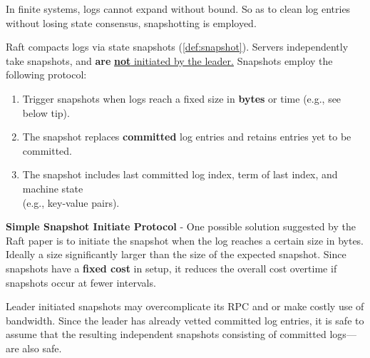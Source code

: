 \noindent
In finite systems, logs cannot expand without bound. So as to clean log entries without losing state consensus, snapshotting is employed.
\begin{Def}

    Raft compacts logs via state snapshots (\ref{def:snapshot}). Servers independently take snapshots, and \textbf{are} \underline{\textbf{not} initiated by the leader.}
    Snapshots employ the following protocol:
    \begin{enumerate}
        \item Trigger snapshots when logs reach a fixed size in \textbf{bytes} or time (e.g., see below tip).
        \item The snapshot replaces \textbf{committed} log entries and retains entries yet to be committed.
        \item The snapshot includes last committed log index, term of last index, and machine state\\
        (e.g., key-value pairs).
    \end{enumerate}
\end{Def}
\begin{Tip} \textbf{Simple Snapshot Initiate Protocol} - One possible 
    solution suggested by the Raft paper is to initiate the snapshot when the log reaches a certain size in bytes.
    Ideally a size significantly larger than the size of the expected snapshot. Since snapshots have a \textbf{fixed cost}
    in setup, it reduces the overall cost overtime if snapshots occur at fewer intervals.
\end{Tip}

\newpage 

\noindent
\begin{Proof}

    Leader initiated snapshots may overcomplicate its RPC and or make costly use of
    bandwidth. Since the leader has already vetted committed 
    log entries, it is safe to assume that the resulting independent snapshots consisting of committed logs---are also safe. 
\end{Proof}

